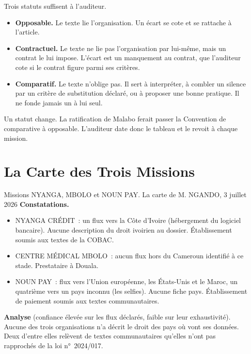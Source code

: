 Trois statuts suffisent à l'auditeur.

\begin{itemize}
    \item \textbf{Opposable.} Le texte lie l'organisation. Un écart se cote
          \NON{} et se rattache à l'article.
    \item \textbf{Contractuel.} Le texte ne lie pas l'organisation par
          lui-même, mais un contrat le lui impose. L'écart est un manquement
          au contrat, que l'auditeur cote si le contrat figure parmi ses
          critères.
    \item \textbf{Comparatif.} Le texte n'oblige pas. Il sert à interpréter,
          à combler un silence par un critère de substitution déclaré, ou à
          proposer une bonne pratique. Il ne fonde jamais un \NON{} à lui
          seul.
\end{itemize}

Un statut change. La ratification de Malabo ferait passer la Convention de
comparative à opposable. L'auditeur date donc le tableau et le revoit à
chaque mission.

\section{La Carte des Trois Missions}
\label{sec:c03-cas}

\begin{boxscenario}{Missions NYANGA, MBOLO et NOUN PAY. La carte de M. NGANDO, 3 juillet 2026}
\textbf{Constatations.}
\begin{itemize}
    \item NYANGA CRÉDIT~: un flux vers la Côte d'Ivoire (hébergement du
          logiciel bancaire). Aucune description du droit ivoirien au
          dossier. Établissement soumis aux textes de la COBAC.
    \item CENTRE MÉDICAL MBOLO~: aucun flux hors du Cameroun identifié à ce
          stade. Prestataire à Douala.
    \item NOUN PAY~: flux vers l'Union européenne, les États-Unis et le
          Maroc, un quatrième vers un pays inconnu (les selfies). Aucune
          fiche pays. Établissement de paiement soumis aux textes
          communautaires.
\end{itemize}

\textbf{Analyse} (confiance élevée sur les flux déclarés, faible sur leur
exhaustivité). Aucune des trois organisations n'a décrit le droit des pays
où vont ses données. Deux d'entre elles relèvent de textes communautaires
qu'elles n'ont pas rapprochés de la loi n°~2024/017.
\end{boxscenario}

